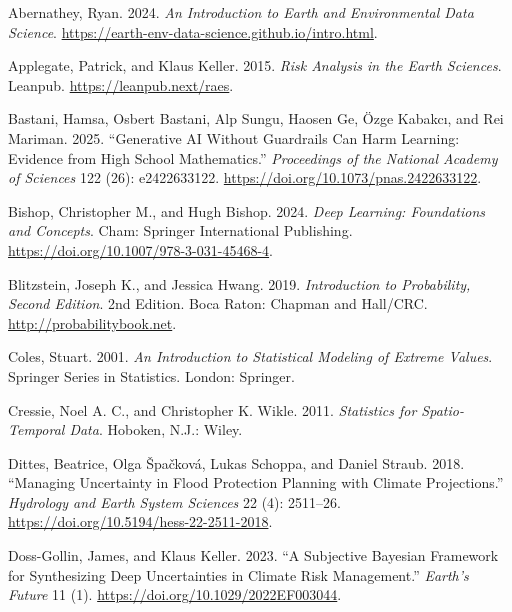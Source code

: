 \documentclass[
  letterpaper,
  DIV=11,
  numbers=noendperiod]{scrreprt}
\newlength{\cslhangindent}
\newenvironment{CSLReferences}[2] %
 {\begin{list}{}{%
  \setlength{\itemindent}{0pt}
  \setlength{\leftmargin}{0pt}
  \setlength{\parsep}{0pt}
  \ifodd #1
   \setlength{\leftmargin}{\cslhangindent}
   \setlength{\itemindent}{-1\cslhangindent}
  \fi
  \setlength{\itemsep}{#2\baselineskip}}}
 {\end{list}}
\begin{document}
\label{refs}
\begin{CSLReferences}{1}{0}
Abernathey, Ryan. 2024. \emph{An {Introduction} to {Earth} and
{Environmental Data Science}}.
\url{https://earth-env-data-science.github.io/intro.html}.

Applegate, Patrick, and Klaus Keller. 2015. \emph{Risk {Analysis} in the
{Earth Sciences}}. Leanpub. \url{https://leanpub.next/raes}.

Bastani, Hamsa, Osbert Bastani, Alp Sungu, Haosen Ge, Özge Kabakcı, and
Rei Mariman. 2025. {``Generative {AI} Without Guardrails Can Harm
Learning: {Evidence} from High School Mathematics.''} \emph{Proceedings
of the National Academy of Sciences} 122 (26): e2422633122.
\url{https://doi.org/10.1073/pnas.2422633122}.

Bishop, Christopher M., and Hugh Bishop. 2024. \emph{Deep {Learning}:
{Foundations} and {Concepts}}. Cham: Springer International Publishing.
\url{https://doi.org/10.1007/978-3-031-45468-4}.

Blitzstein, Joseph K., and Jessica Hwang. 2019. \emph{Introduction to
{Probability}, {Second Edition}}. 2nd Edition. Boca Raton: {Chapman and
Hall/CRC}. \url{http://probabilitybook.net}.

Coles, Stuart. 2001. \emph{An Introduction to Statistical Modeling of
Extreme Values}. Springer Series in Statistics. London: Springer.

Cressie, Noel A. C., and Christopher K. Wikle. 2011. \emph{Statistics
for Spatio-Temporal Data}. Hoboken, N.J.: Wiley.

Dittes, Beatrice, Olga Špačková, Lukas Schoppa, and Daniel Straub. 2018.
{``Managing Uncertainty in Flood Protection Planning with Climate
Projections.''} \emph{Hydrology and Earth System Sciences} 22 (4):
2511--26. \url{https://doi.org/10.5194/hess-22-2511-2018}.

Doss-Gollin, James, and Klaus Keller. 2023. {``A Subjective {Bayesian}
Framework for Synthesizing Deep Uncertainties in Climate Risk
Management.''} \emph{Earth's Future} 11 (1).
\url{https://doi.org/10.1029/2022EF003044}.


\end{CSLReferences}
\end{document}

